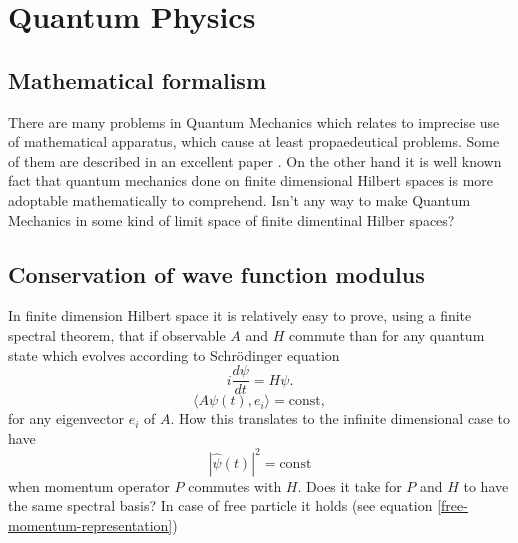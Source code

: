 \documentclass[main.tex]{subfiles}
\begin{document}
\section{Quantum Physics}
\subsection{Mathematical formalism}
There are many problems in Quantum Mechanics which relates to imprecise use of mathematical apparatus, which cause at least propaedeutical problems. Some of them are described in an excellent paper \cite{gieres2000}. On the other hand it is well known fact that quantum mechanics done on finite dimensional Hilbert spaces is more adoptable mathematically to comprehend. Isn't any way to make Quantum Mechanics in some kind of limit space of finite dimentinal Hilber spaces? 
\subsection{Conservation of wave function modulus}
In finite dimension Hilbert space it is relatively easy to prove, using a finite spectral theorem, that if observable $A$ and $H$ commute than for any quantum state which evolves according to Schrödinger equation
\begin{equation}
    i\frac{d\psi}{dt} = H\psi.
\end{equation}
\begin{equation}
\langle A\psi(t), e_i \rangle = \text{const},
\end{equation}
for any eigenvector $e_i$ of $A$. How this translates to the infinite dimensional case to have
\begin{equation}
    |\hat{\psi}(t)|^2 = \text{const}
\end{equation}
when momentum operator $P$ commutes with $H$. Does it take for $P$ and $H$ to have the same spectral basis? In case of free particle it holds (see equation \ref{free-momentum-representation})
\end{document}
